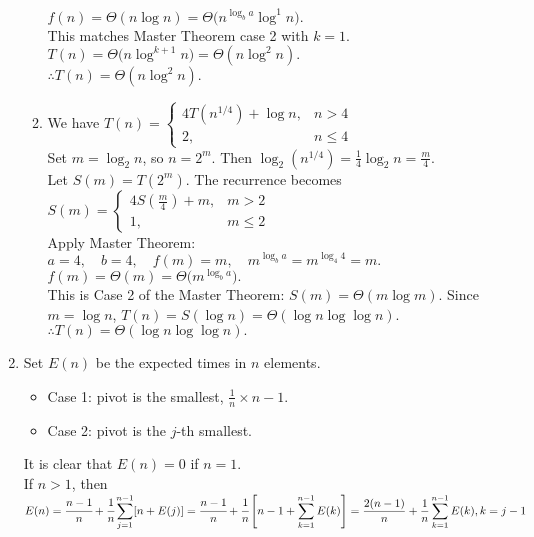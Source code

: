 \documentclass[12pt,a4paper]{article}
\begin{document}
\begin{enumerate}
\begin{enumerate}
        $f(n) = \Theta(n \log n) = \Theta\bigl(n^{\log_b a} \log^1 n\bigr).$\\
        This matches Master Theorem case 2 with $ k = 1 $.  
        $T(n) = \Theta\bigl(n \log^{k+1} n\bigr) = \Theta(n \log^2 n).$\\
        $\therefore T(n) = \Theta(n \log^2 n).$
        \item We have
        $T(n) =
        \begin{cases}
        4T\left(n^{1/4}\right)+\log n, & n>4 \\
        2, & n \le 4
        \end{cases}$\\
        Set $ m = \log_2 n $, so $ n = 2^m $. Then
        $\log_2\left(n^{1/4}\right) = \frac{1}{4}\log_2 n = \frac{m}{4}.$\\
        Let $ S(m) = T(2^m) $. The recurrence becomes
        $S(m) =
        \begin{cases}
        4S\left(\frac{m}{4}\right)+m, & m>2 \\
        1, & m \le 2
        \end{cases}$\\
        Apply Master Theorem:
        $
        a = 4,\quad b = 4,\quad f(m) = m,\quad m^{\log_b a} = m^{\log_4 4} = m.
        $
        $
        f(m) = \Theta(m) = \Theta\bigl(m^{\log_b a}\bigr).
        $\\
        This is Case 2 of the Master Theorem:
        $
        S(m) = \Theta(m \log m).
        $
        Since $ m = \log n $,
        $
        T(n) = S(\log n) = \Theta(\log n \log\log n).
        $\\
        $
        \therefore T(n) = \Theta(\log n \log\log n).
        $
    \end{enumerate}
    \newpage
    \item Set $ E(n) $ be the expected times in $ n $ elements.

    \begin{itemize}
        \item Case 1: pivot is the smallest, $ \frac{1}{n} \times n-1 $.
        \item Case 2: pivot is the $ j $-th smallest.
    \end{itemize}

    It is clear that $E(n)=0$ if $n=1$.\\
    If $ n > 1 $, then
    $E(n) =\cfrac{n-1}{n} + \cfrac{1}{n}\displaystyle\sum_{j=1}^{n-1} [n + E(j)]=\cfrac{n-1}{n}+\cfrac{1}{n}\left[n-1+\displaystyle\sum_{k=1}^{n-1} E(k) \right] = \frac{2(n-1)}{n} + \frac{1}{n} \displaystyle\sum_{k=1}^{n-1} E(k), k=j-1 $


\end{enumerate}
\end{document}
